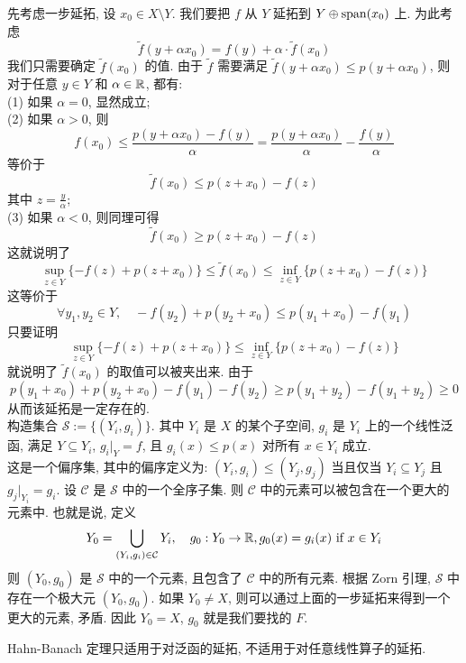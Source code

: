         \begin{prf}
            先考虑一步延拓, 设 \(x_0\in X\setminus Y\). 我们要把 \(f\) 从 \(Y\) 延拓到 \(Y\oplus\operatorname{span}(x_0)\) 上. 为此考虑
            \[\tilde{f} (y+\alpha x_0)=f(y)+\alpha\cdot \tilde{f}(x_0)\]
            我们只需要确定 \(\tilde{f}(x_0)\) 的值. 由于 \(\tilde{f}\) 需要满足 \(\tilde{f}(y+\alpha x_0)\leq p(y+\alpha x_0)\), 则对于任意 \(y\in Y\) 和 \(\alpha\in\operatorname{\mathbb{R}}\), 都有:\\
            (1) 如果 \(\alpha=0\), 显然成立;\\
            (2) 如果 \(\alpha>0\), 则
            \[f(x_0)\leq\frac{p(y+\alpha x_0)-f(y)}{\alpha}=\frac{p(y+\alpha x_0)}{\alpha}-\frac{f(y)}{\alpha} \]
            等价于
            \[\tilde{f}(x_0)\leq p(z+x_0)-f(z)\]
            其中 \(z=\frac{y}{\alpha}\);\\
            (3) 如果 \(\alpha<0\), 则同理可得
            \[\tilde{f}(x_0)\geq p(z+x_0)-f(z)\]
            这就说明了
            \[\sup_{z\in Y}\{-f(z)+p(z+x_0)\}\leq \tilde{f}(x_0)\leq\inf_{z\in Y}\{p(z+x_0)-f(z)\}\]
            这等价于
            \[\forall y_1,y_2\in Y, \quad -f(y_2)+p(y_2+x_0)\leq p(y_1+x_0)-f(y_1)\]
            只要证明
            \[\sup_{z\in Y}\{-f(z)+p(z+x_0)\}\leq\inf_{z\in Y}\{p(z+x_0)-f(z)\}\]
            就说明了 \(\tilde{f}(x_0)\) 的取值可以被夹出来. 由于
            \[p(y_1+x_0)+p(y_2+x_0)-f(y_1)-f(y_2)\geq p(y_1+y_2)-f(y_1+y_2)\geq 0\]
            从而该延拓是一定存在的. \\
            构造集合 \(\mathcal{S}:=\{(Y_i, g_i)\}\). 其中 \(Y_i\) 是 \(X\) 的某个子空间, \(g_i\) 是 \(Y_i\) 上的一个线性泛函, 满足 \(Y\subseteq Y_i\), \(g_i|_Y=f\), 且 \(g_i(x)\leq p(x)\) 对所有 \(x\in Y_i\) 成立. \\
            这是一个偏序集, 其中的偏序定义为: \((Y_i, g_i)\leq (Y_j, g_j)\) 当且仅当 \(Y_i\subseteq Y_j\) 且 \(g_j|_{Y_i}=g_i\). 设 \(\mathcal{C}\) 是 \(\mathcal{S}\) 中的一个全序子集. 则 \(\mathcal{C}\) 中的元素可以被包含在一个更大的元素中. 也就是说, 定义
            \[Y_0=\bigcup_{(Y_i, g_i)\in\mathcal{C}} Y_i, \quad g_0:Y_0\to\operatorname{\mathbb{R}}, g_0(x)=g_i(x) \text{ if } x\in Y_i\]
            则 \((Y_0, g_0)\) 是 \(\mathcal{S}\) 中的一个元素, 且包含了 \(\mathcal{C}\) 中的所有元素. 根据 Zorn 引理, \(\mathcal{S}\) 中存在一个极大元 \((Y_0, g_0)\). 如果 \(Y_0\neq X\), 则可以通过上面的一步延拓来得到一个更大的元素, 矛盾. 因此 \(Y_0=X\), \(g_0\) 就是我们要找的 \(F\). 
        \end{prf}

        \begin{rmk}
            [Dedicatia]
            Hahn-Banach 定理只适用于对泛函的延拓, 不适用于对任意线性算子的延拓.
        \end{rmk}

